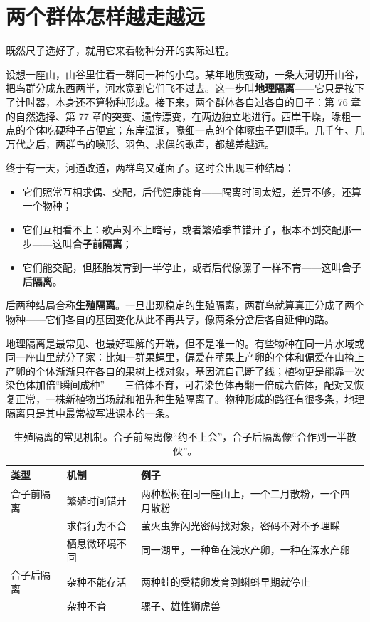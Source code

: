 \section{两个群体怎样越走越远}

既然尺子选好了，就用它来看物种分开的实际过程。

设想一座山，山谷里住着一群同一种的小鸟。某年地质变动，一条大河切开山谷，把鸟群分成东西两半，河水宽到它们飞不过去。这一步叫\textbf{地理隔离}——它只是按下了计时器，本身还不算物种形成。接下来，两个群体各自过各自的日子：第 76 章的自然选择、第 77 章的突变、遗传漂变，在两边独立地进行。西岸干燥，喙粗一点的个体吃硬种子占便宜；东岸湿润，喙细一点的个体啄虫子更顺手。几千年、几万代之后，两群鸟的喙形、羽色、求偶的歌声，都越差越远。

终于有一天，河道改道，两群鸟又碰面了。这时会出现三种结局：

\begin{itemize}[itemsep=2pt]
\item 它们照常互相求偶、交配，后代健康能育——隔离时间太短，差异不够，还算一个物种；
\item 它们互相看不上：歌声对不上暗号，或者繁殖季节错开了，根本不到交配那一步——这叫\textbf{合子前隔离}；
\item 它们能交配，但胚胎发育到一半停止，或者后代像骡子一样不育——这叫\textbf{合子后隔离}。
\end{itemize}

后两种结局合称\textbf{生殖隔离}。一旦出现稳定的生殖隔离，两群鸟就算真正分成了两个物种——它们各自的基因变化从此不再共享，像两条分岔后各自延伸的路。

地理隔离是最常见、也最好理解的开端，但不是唯一的。有些物种在同一片水域或同一座山里就分了家：比如一群果蝇里，偏爱在苹果上产卵的个体和偏爱在山楂上产卵的个体渐渐只在各自的果树上找对象，基因流自己断了线；植物更是能靠一次染色体加倍“瞬间成种”——三倍体不育，可若染色体再翻一倍成六倍体，配对又恢复正常，一株新植物当场就和祖先种生殖隔离了。物种形成的路径有很多条，地理隔离只是其中最常被写进课本的一条。

\begin{table}[htbp]
\centering
\begin{tabular}{p{2.6cm}p{3.4cm}p{6.2cm}}
\toprule
类型 & 机制 & 例子 \\
\midrule
合子前隔离 & 繁殖时间错开 & 两种松树在同一座山上，一个二月散粉，一个四月散粉 \\
 & 求偶行为不合 & 萤火虫靠闪光密码找对象，密码不对不予理睬 \\
 & 栖息微环境不同 & 同一湖里，一种鱼在浅水产卵，一种在深水产卵 \\
合子后隔离 & 杂种不能存活 & 两种蛙的受精卵发育到蝌蚪早期就停止 \\
 & 杂种不育 & 骡子、雄性狮虎兽 \\
\bottomrule
\end{tabular}
\caption{生殖隔离的常见机制。合子前隔离像“约不上会”，合子后隔离像“合作到一半散伙”。}
\end{table}

